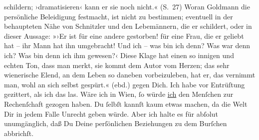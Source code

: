 \begin{ledgroupsized}[t]{13cm}
{{{                     schildern; ›dramatisieren‹ kann er sie noch nicht.« (S. 27) Woran Goldmann die persönliche Beleidigung
                  festmacht, ist nicht zu bestimmen; eventuell in der behaupteten Nähe von Schnitzler und den Lebemännern, die er
                  schildert, oder in dieser Aussage: »›Er ist für eine andere gestorben! für
                     eine Frau, die er geliebt hat – ihr Mann hat ihn umgebracht! Und ich – was bin
                     ich denn? Was war denn ich? Was bin denn ich ihm gewesen?‹ Diese Klage hat einen so
                     innigen und echten Ton, dass man merkt, sie kommt dem Autor vom Herzen; das sehr wienerische Elend, an dem Leben so daneben
                     vorbeizuleben, hat er, das vernimmt man, wohl an sich selbst gespürt.«
                  (ebd.)}}}\label{K_L02752-2h} gegen Dich. {\pb}Ich habe vor
               Entrüſtung gezittert, als ich das las. Wäre ich in Wien, ſo würde \uline{ich} den Menſchen zur Rechenſchaft gezogen haben. Du
               ſelbſt kannſt kaum etwas machen, da die Welt Dir in jedem Falle Unrecht geben würde.
               Aber ich halte es für abſolut unumgänglich, daß Du Deine perſönlichen Beziehungen zu
               dem Burſchen abbrichſt.

\end{ledgroupsized}
